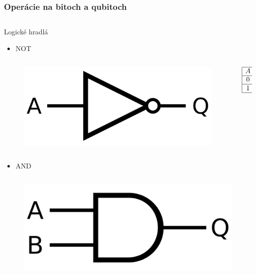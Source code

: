 \documentclass{beamer}
\begin{document}
\begin{frame}
	\frametitle{Operácie na bitoch a qubitoch}
	\begin{columns}[t]
		\begin{column}{.5\textwidth}
			\centering
			Logické hradlá
			\vspace{0.4cm}
			\begin{itemize}
				\item NOT
			\end{itemize}
			     
			\begin{columns}[c]
				\begin{column}{.5\textwidth}
					\begin{figure}
						\includegraphics[width=.5\textwidth]{standard_not_gate.png}            
					\end{figure}
				\end{column}
				\begin{column}{.5\textwidth}
					\begin{displaymath}
						\begin{array}{|c|c|}
							\hline
							A & Q \\
							\hline
							0 & 1 \\
							\hline
							1 & 0 \\
							\hline
						\end{array}   
					\end{displaymath}    
				\end{column}
			\end{columns}
			\begin{itemize}
				\item AND
			\end{itemize}
			\begin{columns}[c]
				\begin{column}{.5\textwidth}
					\begin{figure}
						\includegraphics[width=.5\textwidth]{standard_and_gate.png}            

\end{figure}
\end{column}
\end{columns}
\end{column}
\end{columns}
\end{frame}
\end{document}
